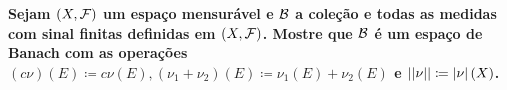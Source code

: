 \textbf{Sejam $(X, \mathcal F)$ um espaço mensurável e $\mathcal B$ a 
coleção e todas as medidas com sinal finitas definidas em $(X, \mathcal F)$. 
Mostre que $\mathcal B$ é um espaço de Banach com as operações $(c\nu)(E) \coloneq c\nu(E), 
(\nu_1 + \nu_2)(E) \coloneq \nu_1(E) + \nu_2(E)$ e $\left|\left|\nu\right|\right| \coloneq \left|\nu\right| (X)$.}
